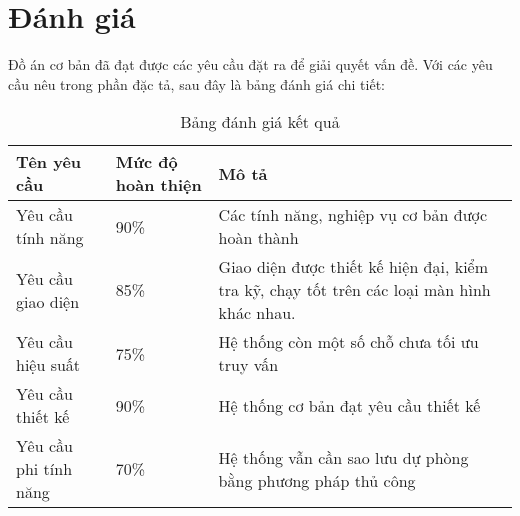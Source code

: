 \fontsize{13px}{13px}\selectfont\justifying

	\section{Đánh giá}

Đồ án cơ bản đã đạt được các yêu cầu đặt ra để giải quyết vấn đề. Với các yêu cầu nêu trong phần đặc tả, sau đây là bảng đánh giá chi tiết:

	\begin{table}[h!]
	\begin{center}
		\caption{Bảng đánh giá kết quả}
		\begin{tabularx}{0.8\textwidth}{ |l|l|X| } 
			\hline
			Tên yêu cầu & Mức độ hoàn thiện & Mô tả\\
			\hline
			Yêu cầu tính năng & 90\% & Các tính năng, nghiệp vụ cơ bản được hoàn thành\\
			Yêu cầu giao diện & 85\% & Giao diện được thiết kế hiện đại, kiểm tra kỹ, chạy tốt trên các loại màn hình khác nhau. \\
			Yêu cầu hiệu suất & 75\% & Hệ thống còn một số chỗ chưa tối ưu truy vấn \\
			Yêu cầu thiết kế & 90\% & Hệ thống cơ bản đạt yêu cầu thiết kế \\
			Yêu cầu phi tính năng & 70\% & Hệ thống vẫn cần sao lưu dự phòng bằng phương pháp thủ công \\
			\hline
		\end{tabularx}

	\end{center}
\end{table}
